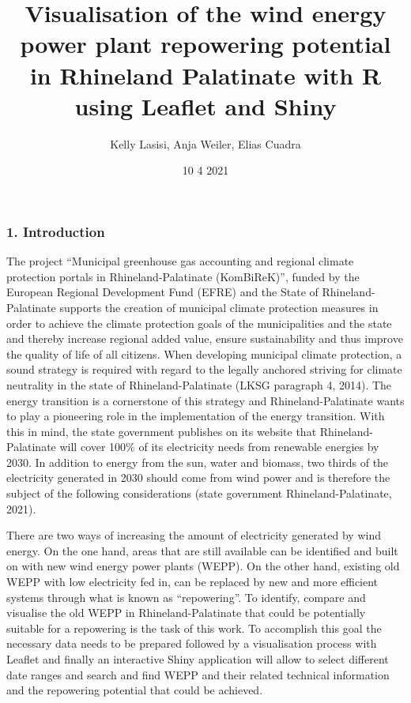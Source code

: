 \documentclass[
]{article}
\title{Visualisation of the wind energy power plant repowering potential
in Rhineland Palatinate with R using Leaflet and Shiny}
\author{Kelly Lasisi, Anja Weiler, Elias Cuadra}
\date{10 4 2021}
\begin{document}
\maketitle

{
\setcounter{tocdepth}{4}
\tableofcontents
}
\hypertarget{introduction}{%
\subsubsection{1. Introduction}\label{introduction}}

The project ``Municipal greenhouse gas accounting and regional climate
protection portals in Rhineland-Palatinate (KomBiReK)'', funded by the
European Regional Development Fund (EFRE) and the State of
Rhineland-Palatinate supports the creation of municipal climate
protection measures in order to achieve the climate protection goals of
the municipalities and the state and thereby increase regional added
value, ensure sustainability and thus improve the quality of life of all
citizens. When developing municipal climate protection, a sound strategy
is required with regard to the legally anchored striving for climate
neutrality in the state of Rhineland-Palatinate (LKSG paragraph 4,
2014). The energy transition is a cornerstone of this strategy and
Rhineland-Palatinate wants to play a pioneering role in the
implementation of the energy transition. With this in mind, the state
government publishes on its website that Rhineland-Palatinate will cover
100\% of its electricity needs from renewable energies by 2030. In
addition to energy from the sun, water and biomass, two thirds of the
electricity generated in 2030 should come from wind power and is
therefore the subject of the following considerations (state government
Rhineland-Palatinate, 2021).

There are two ways of increasing the amount of electricity generated by
wind energy. On the one hand, areas that are still available can be
identified and built on with new wind energy power plants (WEPP). On the
other hand, existing old WEPP with low electricity fed in, can be
replaced by new and more efficient systems through what is known as
``repowering''. To identify, compare and visualise the old WEPP in
Rhineland-Palatinate that could be potentially suitable for a repowering
is the task of this work. To accomplish this goal the necessary data
needs to be prepared followed by a visualisation process with Leaflet
and finally an interactive Shiny application will allow to select
different date ranges and search and find WEPP and their related
technical information and the repowering potential that could be
achieved.
\end{document}
